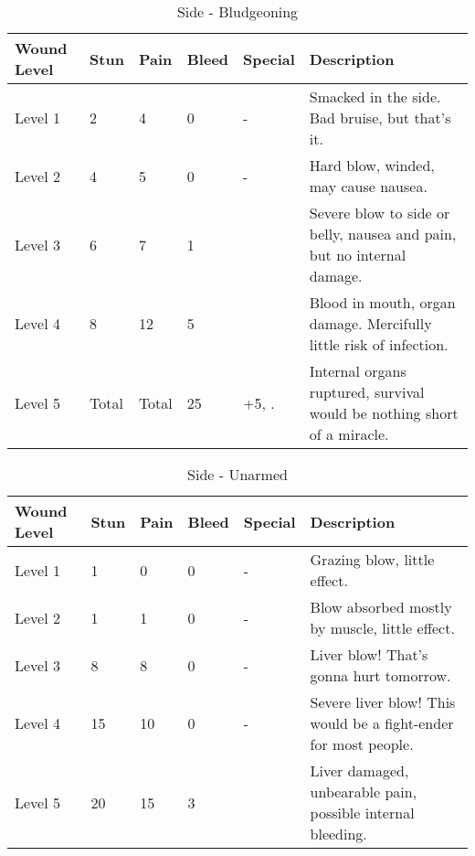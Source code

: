 \documentclass[oneside,11pt,english]{book}
\begin{document}
\begin{table}[hb] %
	\caption{Side - Bludgeoning}
	\label{wound:Side - Bludgeoning}
	\begin{tabu} to 
Wound Level &Stun &Pain &Bleed &Special &Description\\\toprule
Level 1& 2& 4& 0& - &Smacked in the side. Bad bruise, but that’s it.\\
Level 2& 4& 5& 0& - &Hard blow, winded, may cause nausea.\\
Level 3& 6& 7& 1&  &Severe blow to side or belly, nausea and pain, but no internal damage.\\
Level 4& 8& 12& 5&  &Blood in mouth, organ damage. Mercifully little risk of infection.\\
Level 5& Total& Total& 25 
	& +5, \newline
		.
	&Internal organs ruptured, survival would be nothing short of a miracle.\\
	\end{tabu}
\end{table}

\begin{table}[!hb] %
	\caption{Side - Unarmed}
	\label{wound:Side - Unarmed}
	\begin{tabu} to 
Wound Level &Stun &Pain &Bleed &Special &Description\\\toprule
Level 1& 1& 0& 0& - &Grazing blow, little effect.\\
Level 2& 1& 1& 0& - &Blow absorbed mostly by muscle, little effect.\\
Level 3& 8& 8& 0& - &Liver blow! That’s gonna hurt tomorrow.\\
Level 4& 15& 10& 0& - &Severe liver blow! This would be a fight-ender for most people.\\
Level 5& 20& 15& 3&  &Liver damaged, unbearable pain, possible internal bleeding.\\
	\end{tabu}
\end{table}
	\clearpage
\end{document}
